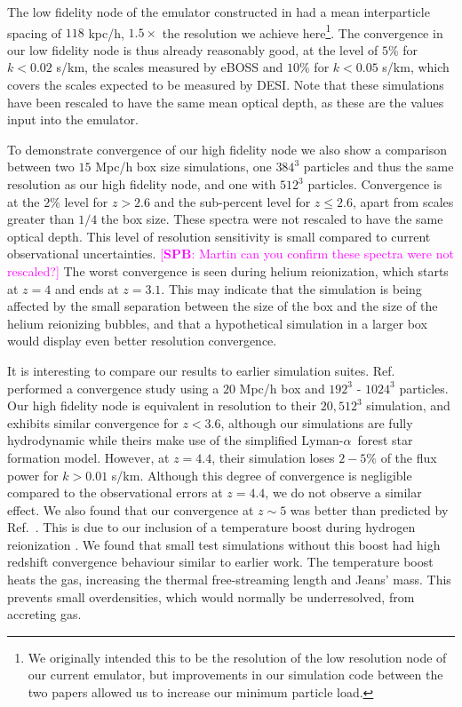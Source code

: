 \documentclass[a4paper,11pt]{article}
\newcommand{\spb}[1]{{\textcolor{magenta}{[{\bf SPB}: #1]}}}
\newcommand{\Lya}{Lyman-$\alpha$}
\begin{document}
The low fidelity node of the emulator constructed in \cite{Fernandez:2022} had a mean interparticle spacing of $118$ kpc/h, $1.5 \times$ the resolution we achieve here\footnote{We originally intended this to be the resolution of the low resolution node of our current emulator, but improvements in our simulation code between the two papers allowed us to increase our minimum particle load.}. The convergence in our low fidelity node is thus already reasonably good, at the level of $5\%$ for $k < 0.02$ s/km, the scales measured by eBOSS and $10\%$ for $k < 0.05$ s/km, which covers the scales expected to be measured by DESI. Note that these simulations have been rescaled to have the same mean optical depth, as these are the values input into the emulator.

To demonstrate convergence of our high fidelity node we also show a comparison between two $15$ Mpc/h box size simulations, one $384^3$ particles and thus the same resolution as our high fidelity node, and one with $512^3$ particles. Convergence is at the $2\%$ level for $z > 2.6$ and the sub-percent level for $z \leq 2.6$, apart from scales greater than $1/4$ the box size. These spectra were not rescaled to have the same optical depth. This level of resolution sensitivity is small compared to current observational uncertainties.
\spb{Martin can you confirm these spectra were not rescaled?}
The worst convergence is seen during helium reionization, which starts at $z=4$ and ends at $z=3.1$. This may indicate that the simulation is being affected by the small separation between the size of the box and the size of the helium reionizing bubbles, and that a hypothetical simulation in a larger box would display even better resolution convergence.

It is interesting to compare our results to earlier simulation suites. Ref.~\cite{Borde:2014} performed a convergence study using a $20$ Mpc/h box and $192^3$ - $1024^3$ particles. Our high fidelity node is equivalent in resolution to their $20, 512^3$ simulation, and exhibits similar convergence for $z < 3.6$, although our simulations are fully hydrodynamic while theirs make use of the simplified \Lya~forest star formation model. However, at $z=4.4$, their simulation loses $2-5\%$ of the flux power for $k > 0.01$ s/km. Although this degree of convergence is negligible compared to the observational errors at $z=4.4$, we do not observe a similar effect.
We also found that our convergence at $z \sim 5$ was better than predicted by Ref.~\cite{2009MNRAS.398L..26B}. This is due to our inclusion of a temperature boost during hydrogen reionization \cite{DAloisio:2019}. We found that small test simulations without this boost had high redshift convergence behaviour similar to earlier work. The temperature boost heats the gas, increasing the thermal free-streaming length and Jeans' mass. This prevents small overdensities, which would normally be underresolved, from accreting gas.
\end{document}
